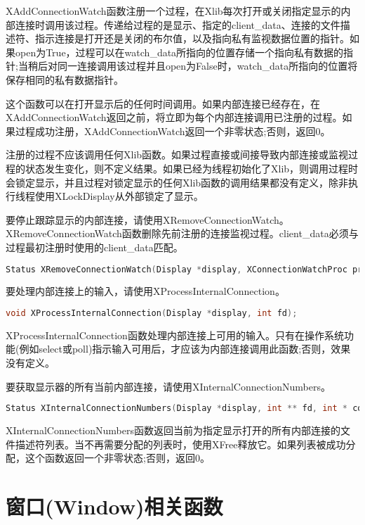 XAddConnectionWatch函数注册一个过程，在Xlib每次打开或关闭指定显示的内部连接时调用该过程。传递给过程的是显示、指定的client\_data、连接的文件描述符、指示连接是打开还是关闭的布尔值，以及指向私有监视数据位置的指针。如果open为True，过程可以在watch\_data所指向的位置存储一个指向私有数据的指针;当稍后对同一连接调用该过程并且open为False时，watch\_data所指向的位置将保存相同的私有数据指针。

这个函数可以在打开显示后的任何时间调用。如果内部连接已经存在，在XAddConnectionWatch返回之前，将立即为每个内部连接调用已注册的过程。如果过程成功注册，XAddConnectionWatch返回一个非零状态;否则，返回0。

注册的过程不应该调用任何Xlib函数。如果过程直接或间接导致内部连接或监视过程的状态发生变化，则不定义结果。如果已经为线程初始化了Xlib，则调用过程时会锁定显示，并且过程对锁定显示的任何Xlib函数的调用结果都没有定义，除非执行线程使用XLockDisplay从外部锁定了显示。

\noindent 要停止跟踪显示的内部连接，请使用XRemoveConnectionWatch。XRemoveConnectionWatch函数删除先前注册的连接监视过程。client\_data必须与过程最初注册时使用的client\_data匹配。
\begin{lstlisting}[language=C]
Status XRemoveConnectionWatch(Display *display, XConnectionWatchProc procedure, XPointer client_data);
\end{lstlisting}

\noindent 要处理内部连接上的输入，请使用XProcessInternalConnection。
\begin{lstlisting}[language=C]
void XProcessInternalConnection(Display *display, int fd);
\end{lstlisting}

\noindent XProcessInternalConnection函数处理内部连接上可用的输入。只有在操作系统功能(例如select或poll)指示输入可用后，才应该为内部连接调用此函数;否则，效果没有定义。

\noindent 要获取显示器的所有当前内部连接，请使用XInternalConnectionNumbers。
\begin{lstlisting}[language=C]
Status XInternalConnectionNumbers(Display *display, int ** fd, int * count_return);
\end{lstlisting}

\noindent XInternalConnectionNumbers函数返回当前为指定显示打开的所有内部连接的文件描述符列表。当不再需要分配的列表时，使用XFree释放它。如果列表被成功分配，这个函数返回一个非零状态;否则，返回0。

\section{窗口(Window)相关函数}

